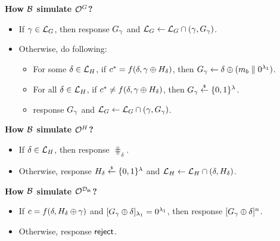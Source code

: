 \documentclass{article}
\begin{document}

\textbf{How $\mathcal{B}$ simulate $\mathcal{O}^{G}$?}

\begin{itemize}
	\item If $\gamma \in \mathcal{L}_{G}$, then response $G_{\gamma}$
	and $\mathcal{L}_{G} \gets \mathcal{L}_{G} \cap (\gamma, G_{\gamma})$.
	\item Otherwise, do following:
	\begin{itemize}
		\item For some $\delta \in \mathcal{L}_{H}$, if $c^* = f(\delta, \gamma \oplus
		H_{\delta})$, then $G_{\gamma} \gets \delta \oplus (m_{b} \parallel
		0^{\lambda_1})$.
		\item For all $\delta \in \mathcal{L}_{H}$, if $c^* \neq f(\delta, \gamma \oplus
		H_{\delta})$, then $G_{\gamma} \overset{{\scriptscriptstyle\$}}{\leftarrow} \{0 ,1\}^{\lambda}$.
		\item response $G_{\gamma}$ and $\mathcal{L}_{G} \gets \mathcal{L}_{G} \cap
		(\gamma, G_{\gamma})$.
	\end{itemize}
\end{itemize}

\textbf{How $\mathcal{B}$ simulate $\mathcal{O}^{H}$?}

\begin{itemize}
	\item If $\delta \in \mathcal{L}_{H}$, then response $\hash_\delta$.
	\item Otherwise, response $H_{\delta} \overset{{\scriptscriptstyle\$}}{\leftarrow} \{0 ,1\}^{\lambda}$ and
	$\mathcal{L}_{H} \gets \mathcal{L}_{H} \cap (\delta, H_{\delta})$.
\end{itemize}

\textbf{How $\mathcal{B}$ simulate $\mathcal{O}^{\mathcal{D}_{\textsf{sk}}}$?} 

\begin{itemize}
	\item If $c = f(\delta, H_{\delta} \oplus \gamma)$ and 
	$[G_{\gamma} \oplus \delta]_{\lambda_1} = 0^{\lambda_1}$, then
	response $[G_{\gamma} \oplus \delta]^n$.
	\item Otherwise, response $\textsf{reject}$.
\end{itemize}
\end{document}
